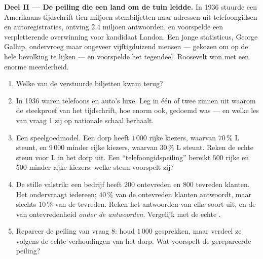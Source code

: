 \begin{problem}
\medskip
\noindent\textbf{Deel II --- De peiling die een land om de tuin leidde.}
In 1936 stuurde een Amerikaans tijdschrift tien miljoen stembiljetten naar adressen
uit telefoongidsen en autoregistraties, ontving $2.4$ miljoen antwoorden, en
voorspelde een verpletterende overwinning voor kandidaat Landon. Een jonge
statisticus, George Gallup, ondervroeg maar ongeveer vijftigduizend mensen ---
gekozen om op de hele bevolking te lijken --- en voorspelde het tegendeel.
Roosevelt won met een enorme meerderheid.
\begin{enumerate}[resume]
  \item Welke  van de verstuurde biljetten kwam terug?
  \item In 1936 waren telefoons en auto's luxe. Leg in één of twee zinnen uit waarom
        de steekproef van het tijdschrift, hoe enorm ook, gedoemd was --- en welke
        les van vraag 1 zij op nationale schaal herhaalt.
  \item Een speelgoedmodel. Een dorp heeft $1\,000$ rijke kiezers, waarvan $70\,\%$
        L steunt, en $9\,000$ minder rijke kiezers, waarvan $30\,\%$ L steunt. Reken
        de echte steun voor L in het dorp uit. Een ``telefoongidspeiling'' bereikt
        $500$ rijke en $500$ minder rijke kiezers: welke steun voorspelt zij?
  \item De stille valstrik: een bedrijf heeft $200$ ontevreden en $800$ tevreden
        klanten. Het ondervraagt iedereen; $40\,\%$ van de ontevreden klanten
        antwoordt, maar slechts $10\,\%$ van de tevreden. Reken het 
        antwoorden van elke soort uit, en de  van ontevredenheid
        \emph{onder de antwoorden}. Vergelijk met de echte .
  \item Repareer de peiling van vraag 8: houd $1\,000$ gesprekken, maar verdeel ze
        volgens de echte verhoudingen van het dorp. Wat voorspelt de gerepareerde
        peiling?
\end{enumerate}


\end{problem}

